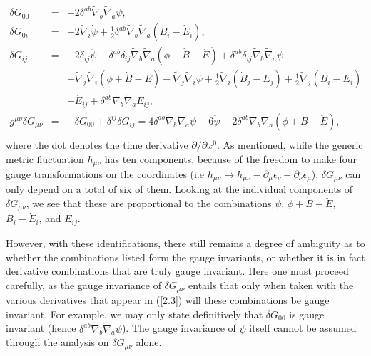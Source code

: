 \begin{eqnarray}
\delta G_{00}&=&- 2 \delta^{ab} \tilde{\nabla}_{b}\tilde{\nabla}_{a}\psi,
\nonumber\\
\delta G_{0i}&=&- 2 \tilde{\nabla}_{i}\dot{\psi}+ \tfrac{1}{2} \delta^{ab} \tilde{\nabla}_{b}\tilde{\nabla}_{a}(B_{i} -  \dot{E}_{i}),
\nonumber\\
\delta G_{ij}&=&- 2 \delta_{ij} \ddot{\psi} -  \delta^{ab} \delta_{ij} \tilde{\nabla}_{b}\tilde{\nabla}_{a}(\phi+\dot{B}  -\ddot{E})+ \delta^{ab} \delta_{ij} \tilde{\nabla}_{b}\tilde{\nabla}_{a}\psi 
	\nonumber\\
&&
+ \tilde{\nabla}_{j}\tilde{\nabla}_{i}(\phi+\dot{B} -  \ddot{E})
-  \tilde{\nabla}_{j}\tilde{\nabla}_{i}\psi
+ \tfrac{1}{2} \tilde{\nabla}_{i}(\dot{B}_{j} - \ddot{E}_{j}) + \tfrac{1}{2} \tilde{\nabla}_{j}(\dot{B}_{i}  
- \ddot{E}_{i})
\nonumber\\
&&- \ddot{E}_{ij} + \delta^{ab} \tilde{\nabla}_{b}\tilde{\nabla}_{a}E_{ij},
\nonumber\\
g^{\mu\nu}\delta G_{\mu\nu}&=&-\delta G_{00}+\delta^{ij}\delta G_{ij}=4 \delta^{ab} \tilde{\nabla}_{b}\tilde{\nabla}_{a}\psi -6\ddot{\psi}-2 \delta^{ab} \tilde{\nabla}_{b}\tilde{\nabla}_{a}(\phi+\dot{B}  -\ddot{E}),
\nonumber\\
\label{2.3}
\end{eqnarray}
%
where the dot denotes the time derivative $\partial/\partial x^0$. As mentioned, while the generic metric fluctuation $h_{\mu\nu}$ has ten components, because of the freedom to make four gauge transformations on the coordinates (i.e $h_{\mu\nu}\rightarrow h_{\mu\nu}-\partial_{\mu}\epsilon_{\nu}-\partial_{\nu}\epsilon_{\mu}$), $\delta G_{\mu\nu}$ can only depend on a total of six of them. Looking at the individual components of $\delta G_{\mu\nu}$, we see that these are proportional to the combinations $\psi$, $\phi+\dot{B}  -\ddot{E}$, $B_{i} -  \dot{E}_{i}$, and $E_{ij}$. 

However, with these identifications, there still remains a degree of ambiguity as to whether the combinations listed form the gauge invariants, or whether it is in fact derivative combinations that are truly gauge invariant. Here one must proceed carefully, as the gauge invariance of $\delta G_{\mu\nu}$ entails that only when taken with the various derivatives that appear in (\ref{2.3}) will these combinations be gauge invariant. For example, we may only state definitively that $\delta G_{00}$ is gauge invariant (hence $\delta^{ab} \tilde{\nabla}_{b}\tilde{\nabla}_{a}\psi$). The gauge invariance of $\psi$ itself cannot be assumed through the analysis on $\delta G_{\mu\nu}$ alone.


